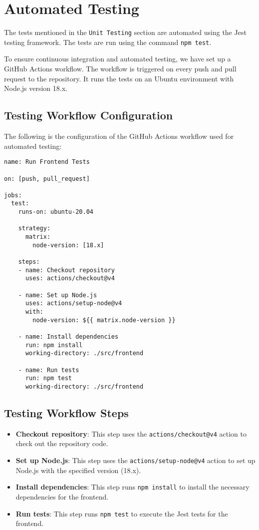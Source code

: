 \documentclass[12pt, titlepage]{article}
\begin{document}

\section{Automated Testing}
The tests mentioned in the \texttt{Unit Testing} section are automated using the Jest testing framework. The tests are run using the command \texttt{npm test}.

To ensure continuous integration and automated testing, we have set up a GitHub Actions workflow. The workflow is triggered on every push and pull request to the repository. It runs the tests on an Ubuntu environment with Node.js version 18.x.

\subsection{Testing Workflow Configuration}

The following is the configuration of the GitHub Actions workflow used for automated testing:

\begin{verbatim}
name: Run Frontend Tests

on: [push, pull_request]

jobs:
  test:
    runs-on: ubuntu-20.04

    strategy:
      matrix:
        node-version: [18.x]

    steps:
    - name: Checkout repository
      uses: actions/checkout@v4

    - name: Set up Node.js
      uses: actions/setup-node@v4
      with:
        node-version: ${{ matrix.node-version }}

    - name: Install dependencies
      run: npm install
      working-directory: ./src/frontend

    - name: Run tests
      run: npm test
      working-directory: ./src/frontend
\end{verbatim}

\subsection{Testing Workflow Steps}

\begin{itemize}
    \item \textbf{Checkout repository}: This step uses the \texttt{actions/checkout@v4} action to check out the repository code.
    \item \textbf{Set up Node.js}: This step uses the \texttt{actions/setup-node@v4} action to set up Node.js with the specified version (18.x).
    \item \textbf{Install dependencies}: This step runs \texttt{npm install} to install the necessary dependencies for the frontend.
    \item \textbf{Run tests}: This step runs \texttt{npm test} to execute the Jest tests for the frontend.
\end{itemize}
\end{document}
